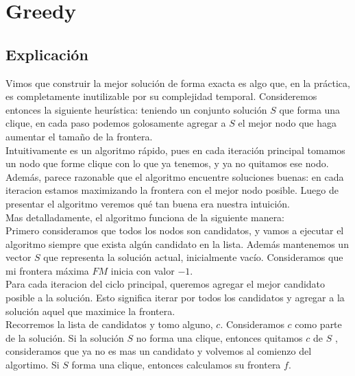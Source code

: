 
\section{Greedy}

\subsection{Explicación}

Vimos que construir la mejor solución de forma exacta es algo que, en la práctica, es completamente inutilizable por su complejidad temporal. Consideremos entonces la siguiente heurística: teniendo un conjunto solución $S$ que forma una clique, en cada paso podemos golosamente agregar a $S$ el mejor nodo que haga aumentar el tamaño de la frontera. \\

Intuitivamente es un algoritmo rápido, pues en cada iteración principal tomamos un nodo que forme clique con lo que ya tenemos, y ya no quitamos ese nodo. Además, parece razonable que el algoritmo encuentre soluciones buenas: en cada iteracion estamos maximizando la frontera con el mejor nodo posible. Luego de presentar el algoritmo veremos qué tan buena era nuestra intuición. \\

Mas detalladamente, el algoritmo funciona de la siguiente manera: \\

Primero consideramos que todos los nodos son candidatos, y vamos a ejecutar el algoritmo siempre que exista algún candidato en la lista. Además mantenemos un vector $S$ que representa la solución actual, inicialmente vacío. Consideramos que mi frontera máxima $FM$ inicia con valor $-1$. \\

Para cada iteracion del ciclo principal, queremos agregar el mejor candidato posible a la solución. Esto significa iterar por todos los candidatos y agregar a la solución aquel que maximice la frontera. \\

Recorremos la lista de candidatos y tomo alguno, $c$. Consideramos $c$ como parte de la solución. Si la solución $S$ no forma una clique, entonces quitamos $c$ de $S$ , consideramos que ya no es mas un candidato y volvemos al comienzo del algortimo. Si $S$ forma una clique, entonces calculamos su frontera $f$. \\

